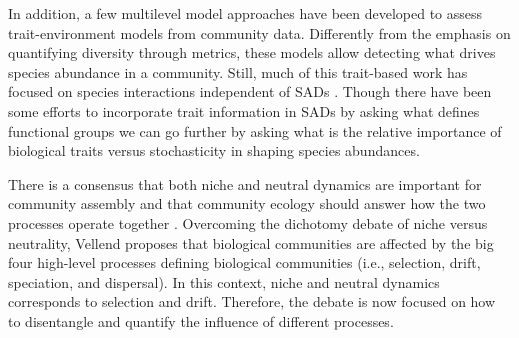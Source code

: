 \documentclass[12pt]{article}
\begin{document}
In addition, a few multilevel model approaches \citep{Pollock2012, Jamil2013, Jamil2013a, Miller2019, TerBraak2019} have been developed to assess trait-environment models from community data. Differently from the emphasis on quantifying diversity through metrics, these models allow detecting what drives species abundance in a community.
Still, much of this trait-based work has focused on species interactions independent of SADs \citep{Swenson2012}. 
Though there have been some efforts to incorporate trait information in SADs \citep{Magurran2003, Supp2015} by asking what defines functional groups we can go further by asking what is the relative importance of biological traits versus stochasticity in shaping species abundances.

 
There is a consensus that both niche and neutral dynamics are important for community assembly \citep{Vellend2014} and that community ecology should answer how the two processes operate together \citep{Gravel2006, Herault2007, Ovaskainen2017}. Overcoming the dichotomy debate of niche versus neutrality, Vellend proposes that biological communities are affected by the big four high-level processes defining biological communities (i.e., selection, drift, speciation, and dispersal). In this context, niche and neutral dynamics %
corresponds to
selection and drift. Therefore, the debate is now focused on how to disentangle and quantify the influence of different processes. %
\end{document}
